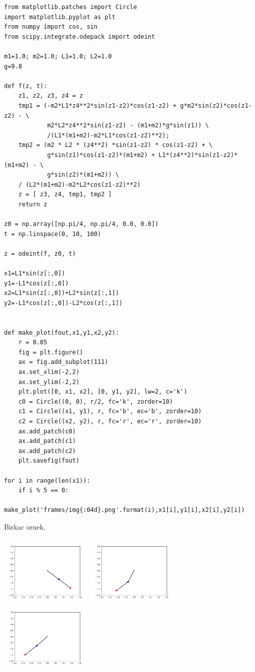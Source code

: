 \documentclass[12pt,fleqn]{article}\usepackage{../../common}
\begin{document}
\begin{verbatim}
from matplotlib.patches import Circle
import matplotlib.pyplot as plt
from numpy import cos, sin
from scipy.integrate.odepack import odeint

m1=1.0; m2=1.0; L1=1.0; L2=1.0
g=9.8

def f(z, t):
    z1, z2, z3, z4 = z
    tmp1 = (-m2*L1*z4**2*sin(z1-z2)*cos(z1-z2) + g*m2*sin(z2)*cos(z1-z2) - \
            m2*L2*z4**2*sin(z1-z2) - (m1+m2)*g*sin(z1)) \
            /(L1*(m1+m2)-m2*L1*cos(z1-z2)**2);
    tmp2 = (m2 * L2 * (z4**2) *sin(z1-z2) * cos(z1-z2) + \
            g*sin(z1)*cos(z1-z2)*(m1+m2) + L1*(z4**2)*sin(z1-z2)*(m1+m2) - \
            g*sin(z2)*(m1+m2)) \
    / (L2*(m1+m2)-m2*L2*cos(z1-z2)**2)
    z = [ z3, z4, tmp1, tmp2 ]
    return z

z0 = np.array([np.pi/4, np.pi/4, 0.0, 0.0])
t = np.linspace(0, 10, 100)

z = odeint(f, z0, t)

x1=L1*sin(z[:,0])
y1=-L1*cos(z[:,0])
x2=L1*sin(z[:,0])+L2*sin(z[:,1])
y2=-L1*cos(z[:,0])-L2*cos(z[:,1])


def make_plot(fout,x1,y1,x2,y2):
    r = 0.05
    fig = plt.figure()
    ax = fig.add_subplot(111)
    ax.set_xlim(-2,2)
    ax.set_ylim(-2,2)
    plt.plot([0, x1, x2], [0, y1, y2], lw=2, c='k')
    c0 = Circle((0, 0), r/2, fc='k', zorder=10)
    c1 = Circle((x1, y1), r, fc='b', ec='b', zorder=10)
    c2 = Circle((x2, y2), r, fc='r', ec='r', zorder=10)
    ax.add_patch(c0)
    ax.add_patch(c1)
    ax.add_patch(c2)
    plt.savefig(fout)

for i in range(len(x1)):
    if i % 5 == 0: 
        make_plot('frames/img{:04d}.png'.format(i),x1[i],y1[i],x2[i],y2[i])
\end{verbatim}

Birkac ornek, 

\includegraphics[width=12em]{frames/img0000.png}
\includegraphics[width=12em]{frames/img0010.png}
\includegraphics[width=12em]{frames/img0015.png}
\end{document}
